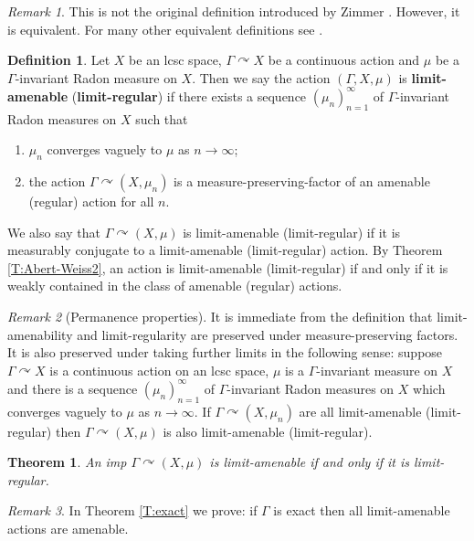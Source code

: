 \documentclass[12pt]{article}
\theoremstyle{plain}
\newtheorem{thm}{Theorem}[section]
\theoremstyle{definition}
\newtheorem{defn}{Definition}
\theoremstyle{remark}
\newtheorem{remark}{Remark}
\newcommand{\G}{\Gamma}
\def\cc{{\curvearrowright}}
\begin{document}
\begin{remark}
    This is not the original definition introduced by Zimmer \cite{MR0470692}. However, it is equivalent. For many other equivalent definitions see \cite{zimmer-1984, MR1235474}.  
\end{remark}

\begin{defn}
Let $X$ be an lcsc space, $\G \cc X$ be a continuous action and $\mu$ be a $\G$-invariant Radon measure on $X$. Then we say the action $(\G,X,\mu)$ is {\bf limit-amenable} ({\bf limit-regular}) if there exists a sequence $(\mu_n)_{n=1}^\infty$ of $\G$-invariant Radon measures on $X$ such that 
\begin{enumerate}
    \item $\mu_n$ converges vaguely to $\mu$ as $n\to\infty$;
    \item the action $\G \cc (X,\mu_n)$ is a measure-preserving-factor of an amenable (regular) action for all $n$.
\end{enumerate}
We also say that $\G\cc (X,\mu)$ is limit-amenable (limit-regular) if it is measurably conjugate to a limit-amenable (limit-regular) action. By Theorem \ref{T:Abert-Weiss2}, an action is limit-amenable (limit-regular) if and only if it is weakly contained in the class of amenable (regular) actions.
\end{defn}

\begin{remark}[Permanence properties]\label{R:permanence}
    It is immediate from the definition that limit-amenability and limit-regularity are preserved under measure-preserving factors. It is also preserved under taking further limits in the following sense: suppose $\G \cc X$ is a continuous action on an lcsc space, $\mu$ is a $\G$-invariant measure on $X$ and there is a sequence $(\mu_n)_{n=1}^\infty$ of $\G$-invariant Radon measures on $X$ which converges vaguely to $\mu$ as $n\to\infty$. If $\G \cc (X,\mu_n)$ are all limit-amenable (limit-regular) then $\G \cc (X,\mu)$ is also limit-amenable (limit-regular).
\end{remark}





\begin{thm}\label{T:limit-regular}
An imp $\G \cc (X,\mu)$ is limit-amenable if and only if it is limit-regular. 
\end{thm}

\begin{remark}
  In Theorem \ref{T:exact} we prove: if $\G$ is exact then all limit-amenable actions are amenable. %
\end{remark}
\end{document}
